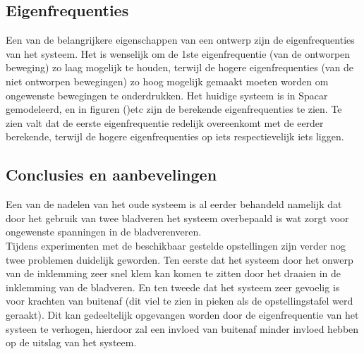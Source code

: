 \documentclass[a4paper]{article}
\begin{document}
\subsection{Eigenfrequenties}
Een van de belangrijkere eigenschappen van een ontwerp zijn de eigenfrequenties van het systeem. Het is wenselijk om de 1ste eigenfrequentie (van de ontworpen beweging) zo laag mogelijk te houden, terwijl de hogere eigenfrequenties (van de niet ontworpen bewegingen) zo hoog mogelijk gemaakt moeten worden om ongewenste bewegingen te onderdrukken. Het huidige systeem is in Spacar gemodeleerd, en in figuren ()etc zijn de berekende eigenfrequenties te zien. Te zien valt dat de eerste eigenfrequentie redelijk overeenkomt met de eerder berekende, terwijl de hogere eigenfrequenties op iets respectievelijk iets liggen.
\subsection{Conclusies en aanbevelingen}
Een van de nadelen van het oude systeem is al eerder behandeld namelijk dat door het gebruik van twee bladveren het systeem overbepaald is wat zorgt voor ongewenste spanningen in de bladverenveren. \\ Tijdens experimenten met de beschikbaar gestelde opstellingen zijn verder nog twee problemen duidelijk geworden. 
Ten eerste dat het systeem door het onwerp van de inklemming zeer snel klem kan komen te zitten door het draaien in de inklemming van de bladveren. 
En ten tweede dat het systeem zeer gevoelig is voor krachten van buitenaf (dit viel te zien in pieken als de opstellingstafel werd geraakt).  Dit kan gedeeltelijk opgevangen worden door de eigenfrequentie van het systeen te verhogen, hierdoor zal een invloed van buitenaf minder invloed hebben op de uitslag van het systeem. \\
\end{document}
